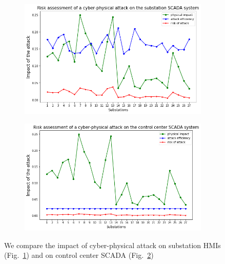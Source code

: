 \begin{figure}[htbp]
	\centering
	\begin{subfigure}{0.23\textwidth}
	\centering
	\includegraphics[width=\textwidth]{fig-impact1.png}
	\caption{}
	\label{sfig:impact1}
	\end{subfigure}
	\begin{subfigure}{0.23\textwidth}
	\centering
	\includegraphics[width=\textwidth]{fig-impact2.png}
	\caption{}
	\label{sfig:impact2}
	\end{subfigure}
	\caption{We compare the impact of cyber-physical attack on substation HMIs (Fig.~\ref{sfig:impact1}) and on control center SCADA (Fig.~\ref{sfig:impact2})}
	\label{fig:result-2}
\end{figure}


